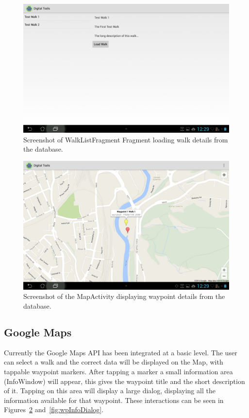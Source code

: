 \documentclass[11pt,a4paper]{article}
\begin{document}
\begin{figure}[H]
\centering
\includegraphics[width=.7\linewidth]{walkListFragment.jpg}
\caption{Screenshot of WalkListFragment Fragment loading walk details from the database.}
\label{fig:walkListFragment}
\end{figure}


\begin{figure}[H]
\centering
\includegraphics[width=.7\linewidth]{googleMapsContentLoader.jpg}
\caption{Screenshot of the MapActivity displaying waypoint details from the database.}
\label{fig:googleContentLoader}
\end{figure}


\subsection{Google Maps}
\label{sec:googlemaps}
Currently the Google Maps API has been integrated at a basic level. The user can select a walk and the correct data will be displayed on the Map, with tappable waypoint markers. After tapping a marker a small information area (InfoWindow) will appear, this gives the waypoint title and the short description of it. Tapping on this area will display a large dialog, displaying all the information available for that waypoint. These interactions can be seen in Figures~\ref{fig:googleContentLoader} and~\ref{fig:wpInfoDialog}.
\end{document}
